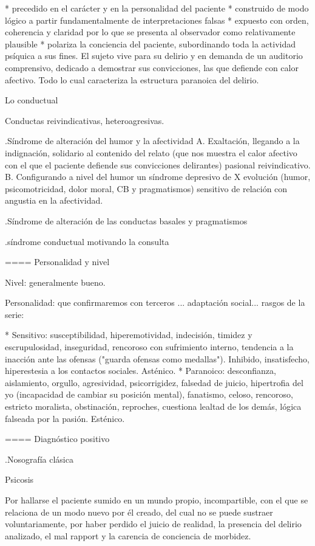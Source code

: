 * precedido en el carácter y en la personalidad del paciente
* construido de modo lógico a partir fundamentalmente de interpretaciones falsas
* expuesto con orden, coherencia y claridad por lo que se presenta al observador como relativamente plausible
* polariza la conciencia del paciente, subordinando toda la actividad psíquica a sus fines. El sujeto vive para su delirio y en demanda de un auditorio comprensivo, dedicado a demostrar sus convicciones, las que defiende con calor afectivo. Todo lo cual caracteriza la estructura paranoica del delirio.

Lo conductual

Conductas reivindicativas, heteroagresivas.

.Síndrome de alteración del humor y la afectividad
A. Exaltación, llegando a la indignación, solidario al contenido del relato (que nos muestra el calor afectivo con el que el paciente defiende sus convicciones delirantes) pasional reivindicativo.
B. Configurando a nivel del humor un síndrome depresivo de X evolución (humor, psicomotricidad, dolor moral, CB y pragmatismos) sensitivo de relación con angustia en la afectividad. 

.Síndrome de alteración de las conductas basales y pragmatismos

.síndrome conductual motivando la consulta

==== Personalidad y nivel

Nivel: generalmente bueno.

Personalidad: que confirmaremos con terceros ... adaptación social... rasgos de la serie:

* Sensitivo: susceptibilidad, hiperemotividad, indecisión, timidez y escrupulosidad, inseguridad, rencoroso con sufrimiento interno, tendencia a la inacción ante las ofensas ("guarda ofensas como medallas"). Inhibido, insatisfecho, hiperestesia a los contactos sociales. Asténico.
* Paranoico: desconfianza, aislamiento, orgullo, agresividad, psicorrigidez, falsedad de juicio, hipertrofia del yo (incapacidad de cambiar su posición mental), fanatismo, celoso, rencoroso, estricto moralista, obstinación, reproches, cuestiona lealtad de los demás, lógica falseada por la pasión. Esténico.

==== Diagnóstico positivo

.Nosografía clásica

Psicosis

Por hallarse el paciente sumido en un mundo propio, incompartible, con el que se relaciona de un modo nuevo por él creado, del cual no se puede sustraer voluntariamente, por haber perdido el juicio de realidad, la presencia del delirio analizado, el mal rapport y la carencia de conciencia de morbidez.

